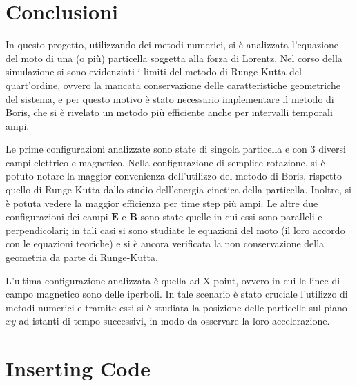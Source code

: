 \documentclass[10pt,a4paper]{article}
\begin{document}
\section{Conclusioni\label{sctn:conclusioni}}

In questo progetto, utilizzando dei metodi numerici, si è analizzata l'equazione del moto di una (o più) particella soggetta alla forza di Lorentz. Nel corso della simulazione si sono evidenziati i limiti del metodo di Runge-Kutta del quart'ordine, ovvero la mancata conservazione delle caratteristiche geometriche del sistema, e per questo motivo è stato necessario implementare il metodo di Boris, che si è rivelato un metodo più efficiente anche per intervalli temporali ampi.

Le prime configurazioni analizzate sono state di singola particella e con 3 diversi campi elettrico e magnetico. Nella configurazione di semplice rotazione, si è potuto notare la maggior convenienza dell'utilizzo del metodo di Boris, rispetto quello di Runge-Kutta dallo studio dell'energia cinetica della particella. Inoltre, si è potuta vedere la maggior efficienza per time step più ampi. Le altre due configurazioni dei campi $\mathbf{E}$ e $\mathbf{B}$ sono state quelle in cui essi sono paralleli e perpendicolari; in tali casi si sono studiate le equazioni del moto (il loro accordo con le equazioni teoriche) e si è ancora verificata la non conservazione della geometria da parte di Runge-Kutta.

L'ultima configurazione analizzata è quella ad X point, ovvero in cui le linee di campo magnetico sono delle iperboli. In tale scenario è stato cruciale l'utilizzo di metodi numerici e tramite essi si è studiata la posizione delle particelle sul piano $xy$ ad istanti di tempo successivi, in modo da osservare la loro accelerazione.


\clearpage
\appendix
\section{Inserting Code\label{sctn:codice}}
\end{document}
